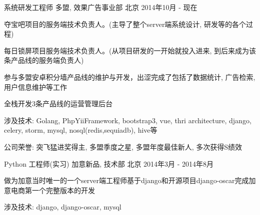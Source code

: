 

\begin{cventries}

  \cventry
    {系统研发工程师} %
    {多盟, 效果广告事业部} %
    {北京} %
    {2014年10月 - 现在} %
    {
      \begin{cvitems} %
        \item {夺宝吧项目的服务端技术负责人。(主导了整个server端系统设计, 研发等的各个过程)}
        \item {每日锁屏项目服务端技术负责人。(从项目研发的一开始就投入进来, 到后来成为该条产品线的服务端负责人)}
        \item {参与多盟安卓积分墙产品线的维护与开发，出涩完成了包括了数据统计, 广告检索, 用户信息维护等工作}
        \item {全栈开发3条产品线的运营管理后台}
        \item {涉及技术: Golang, PhpYiiFramework, bootstrap3, vue, thri architecture, django, celery, storm, mysql, nosql(redis,sequiadb), hive等}
        \item {公司荣誉: 突飞猛进奖得主, 多盟季度之星, 多盟年度最佳新人, 多次获得S绩效}
      \end{cvitems}
    }

  \cventry
    {Python 工程师(实习)} %
    {加意新品, 技术部} %
    {北京} %
    {2014年3月 - 2014年8月} %
    {
      \begin{cvitems} %
      \item {做为加意当时唯一的一个server端工程师基于django和开源项目django-oscar完成加意电商第一个完整版本的开发}
      \item {涉及技术: django, django-oscar, mysql}
      \end{cvitems}
    }

\end{cventries}
